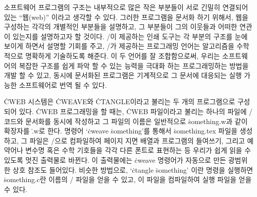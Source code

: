 소프트웨어 프로그램의 구조는 내부적으로 많은 작은 부분들이 서로 긴밀히 연결되어 있는
``웹(web)'' 이라고 생각할 수 있다. 그러한 프로그램을 문서화 하기 위해서, 웹을 구성하는 각각의
개별적인 부분들을 설명하고, 그 부분들이 그의 이웃들과 어떠한 연관이 있는지를 설명하고자 할
것이다. \TEX/이 제공하는 인쇄 도구는 각 부분의 구조를 눈에 보이게 하면서 설명할 기회를 주고,
\CEE/가 제공하는 프로그래밍 언어는 알고리즘을 수학적으로 명확하게 기술하도록 해준다.
이 두 언어를 잘 조합함으로써, 우리는 소프트웨어의 복잡한 구조를 쉽게 파악 할 수 있는 능력을
극대화 하는 프로그래밍하는 방법을 개발 할 수 있고, 동시에 문서화된 프로그램은 기계적으로 그
문서에 대응되는 실행 가능한 소프트웨어로 번역 될 수 있다.

\.{CWEB} 시스템은 \.{CWEAVE}와 \.{CTANGLE}이라고 불리는 두 개의 프로그램으로 구성되어
있다. \.{CWEB} 프로그래밍을 할 때는, \.{CWEB} 파일이라고 불리는 하나의 파일에 \CEE/ 코드와
문서화를 동시에 작성하고 그 파일의 이름은 일반적으로 \.{something.w}과 같이 확장자를
\.{.w}로 한다. 명령어 `\.{cweave} \.{something}'를 통해서 \.{something.tex} 파일을
생성하고, 그 파일은 \TEX/으로 컴파일하여 페이지 지면 배열과 프로그램의 들여쓰기, 그리고
예약어나 변수명 혹은 수학 기호들을 각각 다른 폰트로 표현하는 등 우리가 쉽게 읽을 수 있도록
멋진 출력물로 바뀐다. 이 출력물에는 \.{cweave} 명령어가 자동으로 만든 광범위한 상호 참조도
들어있다. 비슷한 방법으로, `\.{ctangle} \.{something}' 이란 명령을 실행하면
\.{something.c}란  이름의 \CEE/ 파일을 얻을 수 있고, 이 파일을 컴파일하여 실행 파일을
얻을 수 있다.

